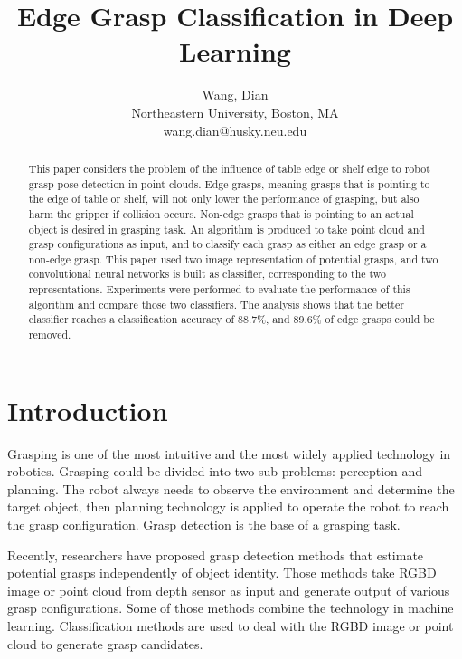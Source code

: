 \documentclass[letterpaper]{article} %
\begin{document}
%

\title{Edge Grasp Classification in Deep Learning}
\author{Wang, Dian\\
Northeastern University, Boston, MA\\
{wang.dian@husky.neu.edu}
}
\maketitle
\begin{abstract}
This paper considers the problem of the influence of table edge or shelf edge to robot grasp pose detection in point clouds. Edge grasps, meaning grasps that is pointing to the edge of table or shelf, will not only lower the performance of grasping, but also harm the gripper if collision occurs. Non-edge grasps that is pointing to an actual object is desired in grasping task. An algorithm is produced to take point cloud and grasp configurations as input, and to classify each grasp as either an edge grasp or a non-edge grasp. This paper used two image representation of potential grasps, and two convolutional neural networks is built as classifier, corresponding to the two representations. Experiments were performed to evaluate the performance of this algorithm and compare those two classifiers. The analysis shows that the better classifier reaches a classification accuracy of 88.7\%, and 89.6\% of edge grasps could be removed.
\end{abstract}

\section{Introduction}
\noindent Grasping is one of the most intuitive and the most widely applied technology in robotics. Grasping could be divided into two sub-problems: perception and planning. The robot always needs to observe the environment and determine the target object, then planning technology is applied to operate the robot to reach the grasp configuration. Grasp detection is the base of a grasping task.

Recently, researchers have proposed grasp detection methods that estimate potential grasps independently of object identity. Those methods take RGBD image or point cloud from depth sensor as input and generate output of various grasp configurations. Some of those methods combine the technology in machine learning. Classification methods are used to deal with the RGBD image or point cloud to generate grasp candidates. 
\end{document}
